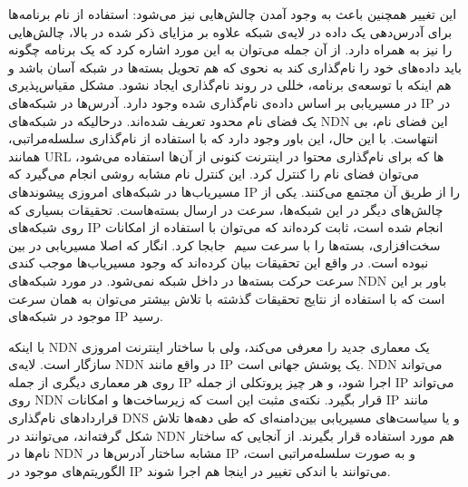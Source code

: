 
این تغییر همچنین باعث به وجود آمدن چالش‌هایی نیز می‌شود: 
 استفاده از نام برنامه‌‌ها برای آدرس‌دهی یک داده در لایه‌ی شبکه علاوه بر مزایای ذکر شده در بالا، چالش‌هایی را نیز به همراه دارد. از آن جمله می‌توان به این مورد اشاره کرد که یک برنامه چگونه باید داده‌‌های خود را نام‌گذاری کند به نحوی که هم تحویل بسته‌ها در شبکه آسان باشد و هم اینکه با توسعه‌ی برنامه، خللی در روند نام‌گذاری ایجاد نشود. 
 مشکل مقیاس‌پذیری در مسیریابی بر اساس داده‌ی نام‌گذاری شده وجود دارد. آدرس‌ها در شبکه‌های IP در یک فضای نام محدود تعریف شده‌اند. درحالیکه در شبکه‌‌های NDN  این فضای نام، بی انتهاست. با این حال، این باور وجود دارد که با استفاده از نام‌گذاری سلسله‌مراتبی، همانند URL ها که برای نام‌گذاری محتوا در اینترنت کنونی از آن‌ها استفاده می‌شود، می‌توان فضای نام را کنترل کرد. این کنترل نام مشابه روشی انجام می‌گیرد که مسیریاب‌ها در شبکه‌های امروزی پیشوندهای IP را از طریق آن مجتمع می‌کنند. 
 یکی از چالش‌های دیگر در این شبکه‌ها، سرعت در ارسال بسته‌هاست. تحقیقات بسیاری که روی شبکه‌‌های IP انجام شده است، ثابت‌ کرده‌اند  که می‌توان با استفاده از امکانات سخت‌افزاری، بسته‌ها را با سرعت سیم ‌ جابجا کرد. انگار که اصلا مسیریابی در بین نبوده است. در واقع این تحقیقات بیان کرده‌اند که وجود مسیریاب‌ها موجب کندی سرعت حرکت بسته‌ها در داخل شبکه  نمی‌شود. در مورد شبکه‌های NDN باور بر این است که با استفاده از نتایج تحقیقات گذشته با تلاش بیشتر می‌توان به همان سرعت موجود در شبکه‌های IP رسید. 

با اینکه NDN یک معماری جدید را معرفی می‌کند، ولی با ساختار اینترنت امروزی سازگار است. لایه‌ی NDN در واقع مانند IP یک پوشش جهانی است. NDN می‌تواند روی هر معماری دیگری از جمله IP  اجرا شود، و هر چیز پروتکلی از جمله IP می‌تواند روی NDN قرار بگیرد. نکته‌ی مثبت این است که زیرساخت‌ها و امکانات ‌IP مانند قرارداد‌های نام‌گذاری DNS و یا سیاست‌های مسیریابی بین‌دامنه‌ای
که طی دهه‌ها تلاش شکل گرفته‌اند، می‌توانند در NDN هم مورد استفاده قرار بگیرند. از آنجایی که ساختار نام‌‌ها در NDN مشابه ساختار آدرس‌ها در IP و به صورت سلسله‌مراتبی است، الگوریتم‌های موجود در IP می‌توانند با اندکی تغییر در اینجا هم اجرا شوند. 

